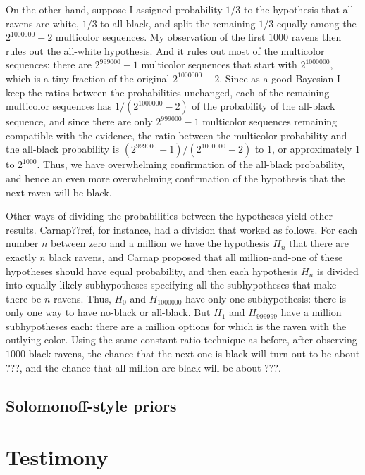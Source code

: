 On the other hand, suppose I assigned probability $1/3$ to the hypothesis that all ravens are white, $1/3$ to all black,
and split the remaining $1/3$ equally among the $2^{1000000}-2$ multicolor sequences. My observation of the first $1000$
ravens then rules out the all-white  hypothesis. And it rules out most of the multicolor sequences: there are $2^{999000}-1$
multicolor sequences that start with $2^{1000000}$, which is a tiny fraction of the original $2^{1000000}-2$. Since as a 
good Bayesian I keep the ratios between the probabilities unchanged, each of the remaining multicolor sequences has 
$1/(2^{1000000}-2)$ of the probability of the all-black sequence, and since there are only $2^{999000}-1$ multicolor
sequences remaining compatible with the evidence, the ratio between the multicolor probability and the all-black probability
is $(2^{999000}-1)/(2^{1000000}-2)$ to $1$, or approximately $1$ to $2^{1000}$. Thus, we have overwhelming confirmation of 
the all-black probability, and hence an even more overwhelming confirmation of the hypothesis that the next raven will be black.

Other ways of dividing the probabilities between the hypotheses yield other results. Carnap??ref, for instance, had a division
that worked as follows. For each number $n$ between zero and a million we have the hypothesis $H_n$ that there are exactly 
$n$ black ravens, and Carnap proposed that all million-and-one of these hypotheses should have equal probability, and then 
each hypothesis $H_n$ is divided into equally likely subhypotheses specifying all the subhypotheses that make there be $n$
ravens. Thus, $H_0$ and $H_{1000000}$ have only one subhypothesis: there is only one way to have no-black or all-black. But
$H_1$ and $H_{999999}$ have a million subhypotheses each: there are a million options for which is the raven with the outlying
color. Using the same constant-ratio technique as before, after observing $1000$ black ravens, the chance that the next one is black 
will turn out to be about ???, and the chance that all million are black will be about ???.


\subsection{Solomonoff-style priors}


\section{Testimony}

